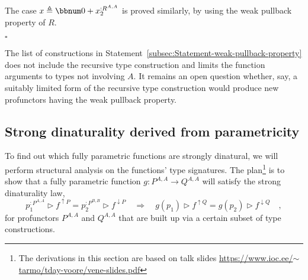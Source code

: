 The case $x\triangleq\bbnum 0+x_{2}^{:R^{A,A}}$ is proved similarly,
by using the weak pullback property of $R$. %
\begin{comment}
\textbf{(f)} Rewrite the wedge relation for $x^{:S^{A,A,P^{A,A}}}$
and $y^{:S^{B,B,P^{B,B}}}$ by using the explicit liftings to $S$:
\[
x\triangleright f^{\uparrow S^{A,\bullet,P^{A,A}}}\bef\big(\overline{f^{\uparrow P^{A,\bullet}}}\big)^{\uparrow S^{A,B,\bullet}}=y\triangleright f^{\downarrow S^{\bullet,B,P^{B,B}}}\bef\big(\overline{f^{\downarrow P^{\bullet,B}}}\big)^{\uparrow S^{A,B,\bullet}}\quad.
\]
Due to the commutativity law of $S$, we may exchange the order of
compositions here:
\[
x\triangleright\big(\overline{f^{\uparrow P^{A,\bullet}}}\big)^{\uparrow S^{A,A,\bullet}}\triangleright f^{\uparrow S^{A,\bullet,P^{A,B}}}=y\triangleright\big(\overline{f^{\downarrow P^{\bullet,B}}}\big)^{\uparrow S^{B,B,\bullet}}\triangleright f^{\downarrow S^{\bullet,B,P^{A,B}}}\quad.
\]
Now we can use the weak pullback property of $S$ to obtain some $z:S^{B,A,P^{A,B}}$
such that
\[
x\triangleright\big(\overline{f^{\uparrow P^{A,\bullet}}}\big)^{\uparrow S^{A,A,\bullet}}=z\triangleright f^{\downarrow S^{\bullet,A,P^{A,B}}}\text{ and }y\triangleright\big(\overline{f^{\downarrow P^{\bullet,B}}}\big)^{\uparrow S^{B,B,\bullet}}=z\triangleright f^{\uparrow S^{B,\bullet,P^{A,B}}}\quad.
\]
We need to produce a value $t:S^{B,A,P^{B,A}}$ such that 
\[
x=t\triangleright f^{\downarrow S^{\bullet,A,P^{B,A}}}\bef\big(\overline{f^{\downarrow P^{\bullet,A}}}\big)^{\uparrow S^{A,A,\bullet}}\text{ and }y=t\triangleright f^{\uparrow S^{B,\bullet,P^{B,A}}}\bef\big(\overline{f^{\uparrow P^{B,\bullet}}}\big)^{\uparrow S^{B,B,\bullet}}\quad.
\]

{*}{*}{*}
\end{comment}
$\square$

The list of constructions in Statement~\ref{subsec:Statement-weak-pullback-property}
does not include the recursive type construction and limits the function
arguments to types not involving $A$. It remains an open question
whether, say, a suitably limited form of the recursive type construction
would produce new profunctors having the weak pullback property.

\subsection{Strong dinaturality derived from parametricity\label{subsec:Strong-dinaturality-derived-from-parametricity}}

To find out which fully parametric functions are strongly dinatural,
we will perform structural analysis on the functions\textsf{'} type signatures.
The plan\footnote{The derivations in this section are based on talk slides \href{https://www.ioc.ee/~tarmo/tday-voore/vene-slides.pdf}{https://www.ioc.ee/$\sim$tarmo/tday-voore/vene-slides.pdf}}
is to show that a fully parametric function $g:P^{A,A}\rightarrow Q^{A,A}$
will satisfy the strong dinaturality law,
\[
p_{1}^{:P^{A,A}}\triangleright f^{\uparrow P}=p_{2}^{:P^{B,B}}\triangleright f^{\downarrow P}\quad\Rightarrow\quad g(p_{1})\triangleright f^{\uparrow Q}=g(p_{2})\triangleright f^{\downarrow Q}\quad,
\]
for profunctors $P^{A,A}$ and $Q^{A,A}$ that are built up via a
certain subset of type constructions. 

